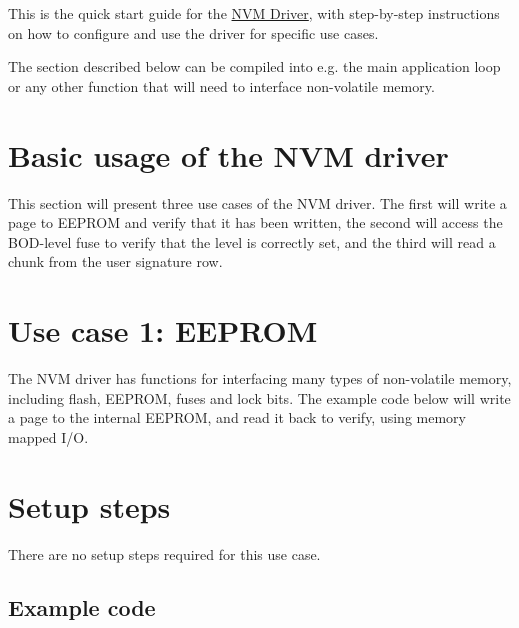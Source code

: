 This is the quick start guide for the \hyperlink{group__nvm__group}{N\-V\-M Driver}, with step-\/by-\/step instructions on how to configure and use the driver for specific use cases.

The section described below can be compiled into e.\-g. the main application loop or any other function that will need to interface non-\/volatile memory.\hypertarget{xmega_nvm_quickstart_xmega_nvm_quickstart_basic}{}\section{Basic usage of the N\-V\-M driver}\label{xmega_nvm_quickstart_xmega_nvm_quickstart_basic}
This section will present three use cases of the N\-V\-M driver. The first will write a page to E\-E\-P\-R\-O\-M and verify that it has been written, the second will access the B\-O\-D-\/level fuse to verify that the level is correctly set, and the third will read a chunk from the user signature row.\hypertarget{xmega_nvm_quickstart_xmega_nvm_quickstart_eeprom_case}{}\section{Use case 1\-: E\-E\-P\-R\-O\-M}\label{xmega_nvm_quickstart_xmega_nvm_quickstart_eeprom_case}
The N\-V\-M driver has functions for interfacing many types of non-\/volatile memory, including flash, E\-E\-P\-R\-O\-M, fuses and lock bits. The example code below will write a page to the internal E\-E\-P\-R\-O\-M, and read it back to verify, using memory mapped I/\-O.\hypertarget{xmega_nvm_quickstart_xmega_nvm_quickstart_eeprom_case_setup_steps}{}\section{Setup steps}\label{xmega_nvm_quickstart_xmega_nvm_quickstart_eeprom_case_setup_steps}
There are no setup steps required for this use case.\hypertarget{xmega_nvm_quickstart_nvm_quickstart_eeprom_case_example_code}{}\subsection{Example code}\label{xmega_nvm_quickstart_nvm_quickstart_eeprom_case_example_code}


